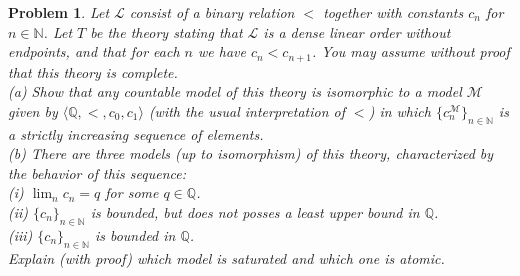 \documentclass{article}
\newtheorem{problem}{Problem}
\begin{document}
\begin{problem}
Let $\mathcal{L}$ consist of a binary relation $<$ together with constants $c_n$ for $n \in \mathbb{N}$. Let $T$ be the theory stating that $\mathcal{L}$ is a dense linear order without endpoints, and that for each $n$ we have $c_n < c_{n+1}$. You may assume without proof that this theory is complete.\\
(a) Show that any countable model of this theory is isomorphic to a model $\mathcal{M}$ given by $\langle \mathbb{Q}, < , c_0, c_1 \rangle$ (with the usual interpretation of $<$) in which $\{c_n^{\mathcal{M}}\}_{n \in \mathbb{N}}$ is a strictly increasing sequence of elements.\\
(b) There are three models (up to isomorphism) of this theory, characterized by the behavior of this sequence:\\
(i) $\lim_{n} c_n = q$ for some $q \in \mathbb{Q}$.\\
(ii) $\{c_n\}_{n \in \mathbb{N}}$ is bounded, but does not posses a least upper bound in $\mathbb{Q}$.\\
(iii) $\{c_n\}_{n \in \mathbb{N}}$ is bounded in $\mathbb{Q}$.\\
Explain (with proof) which model is saturated and which one is atomic.
\end{problem}
\end{document}
